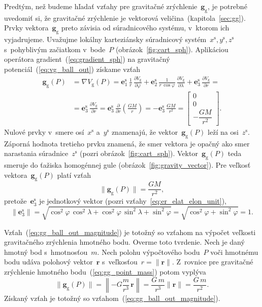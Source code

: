 \documentclass[a4paper, 12pt]{book}
\newcommand{\gidx}{\mathrm g}
\let\vec\mathbf
\begin{document}
Predtým, než budeme hľadať vzťahy pre gravitačné zrýchlenie~$\vec g_\gidx$, je 
potrebné uvedomiť si, že gravitačné zrýchlenie je vektorová 
veličina~(kapitola~\ref{sec:gg}).  Prvky vektora~$\vec g_\gidx$ preto závisia 
od súradnicového systému, v~ktorom ich vyjadrujeme.  Uvažujme lokálny 
karteziánsky súradnicový systém~$x^\mathrm{s}, y^\mathrm{s}, z^\mathrm{s}$ 
s~pohyblivým začiatkom v~bode~$P$ (obrázok~\ref{fig:cart_sph}).  Aplikáciou 
operátora gradient~(\ref{eq:gradient_sph}) na gravitačný 
potenciál~(\ref{eq:vg_ball_out}) získame vzťah
%
\begin{equation}
\label{eq:gg_ball}
\begin{split}
\vec g_\gidx(P) &= \nabla V_\gidx(P) = \vec e_1^\mathrm{s} \, \frac{1}{r} \, 
\frac{\partial V_\gidx}{\partial \varphi} + \vec e_2^\mathrm{s} \, \frac{1}{r 
\, \cos\varphi} \, \frac{\partial V_\gidx}{\partial \lambda} + \vec 
e_3^\mathrm{s} \, \frac{\partial V_\gidx}{\partial r} =\\
%
&=\vec e_3^\mathrm{s} \, \frac{\partial V_\gidx}{\partial r} = \vec 
e_3^\mathrm{s} \, \frac{\partial}{\partial r}\left( \frac{GM}{r} \right) 
= -\vec e_3^\mathrm{s} \, \frac{GM}{r^2}
%
=
%
\begin{bmatrix}
0\\
0\\
-\dfrac{GM}{r^2}
\end{bmatrix}
%
{.}
\end{split}
\end{equation}
%
Nulové prvky v~smere osí~$x^\mathrm{s}$ a~$y^\mathrm{s}$ znamenajú, že 
vektor~$\vec g_\gidx(P)$ leží na osi~$z^\mathrm{s}$.  Záporná hodnota tretieho 
prvku znamená, že smer vektora je opačný ako smer narastania 
súradnice~$z^\mathrm{s}$ (pozri obrázok~\ref{fig:cart_sph}).  Vektor~$\vec 
g_\gidx(P)$ teda smeruje do ťažiska homogénnej gule 
(obrázok~\ref{fig:gravity_vector}).  Pre veľkosť vektora~$\vec g_\gidx(P)$ 
platí vzťah
%
\begin{equation}
\label{eq:gg_ball_out_magnitude}
\| \vec g_\gidx(P) \| = \frac{GM}{r^2}{,}
\end{equation}
%
pretože~$\vec e_3^\mathrm{s}$ je jednotkový vektor (pozri 
vzťahy~\ref{eq:er_elat_elon_unit}),
%
\begin{equation}
\| \vec e_3^\mathrm{s} \| = \sqrt{\cos^2\varphi \, \cos^2\lambda 
+ \cos^2\varphi \, \sin^2\lambda + \sin^2\varphi} = \sqrt{\cos^2\varphi 
+ \sin^2\varphi} = 1{.}
\end{equation}

Vzťah~(\ref{eq:gg_ball_out_magnitude}) je totožný so vzťahom na výpočet 
veľkosti gravitačného zrýchlenia hmotného bodu.  Overme toto tvrdenie.  Nech je 
daný hmotný bod s~hmotnosťou~$m$.  Nech polohu výpočtového bodu~$P$ voči 
hmotnému bodu udáva polohový vektor~$\vec r$ s~veľkosťou~$r = \| \vec r \|$.  
Z~rovnice pre gravitačné zrýchlenie hmotného bodu~(\ref{eq:gg_point_mass}) 
potom vyplýva
%
\begin{equation}
\label{eq:gg_point_mass_magnitude}
\| \vec g_\gidx(P) \| = \left\lVert -G \frac{m}{r^3} \, \vec r \right\rVert 
= \frac{G \, m}{r^3} \| \vec r \| = \frac{G \, m}{r^2}{.}
\end{equation}
%
Získaný vzťah je totožný so vzťahom~(\ref{eq:gg_ball_out_magnitude}).
\end{document}
